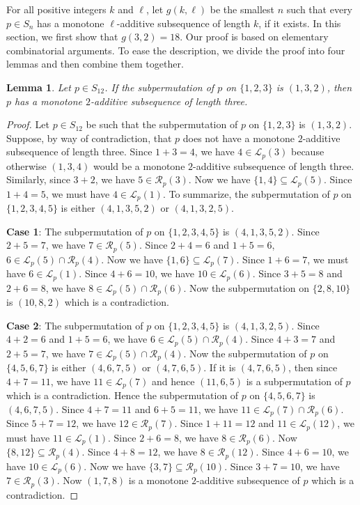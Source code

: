 \documentclass[10pt,a4paper]{amsart}
\newtheorem{lemma}[theorem]{Lemma}
\begin{document}
For all positive integers $k$ and $\ell$, let $g(k,\ell)$ be the smallest $n$ such that every $p\in S_n$ has a monotone $\ell$-additive subsequence of length $k$, if it exists. In this section, we first show that $g(3,2)=18$. Our proof is based on elementary combinatorial arguments. To ease the description, we divide the proof into four lemmas and then combine them together.

\begin{lemma}\label{Lemma:Monotone132}
Let $p\in S_{12}$. If the subpermutation of $p$ on $\{1,2,3\}$ is $(1,3,2)$, then $p$ has a monotone $2$-additive subsequence of length three.
\end{lemma}
\begin{proof}
    Let $p\in S_{12}$ be such that the subpermutation of $p$ on $\{1,2,3\}$ is $(1,3,2)$. Suppose, by way of contradiction, that $p$ does not have a monotone $2$-additive subsequence of length three. Since $1+3=4$, we have $4\in\mathcal{L}_p(3)$ because otherwise $(1,3,4)$ would be a monotone $2$-additive subsequence of length three. Similarly, since $3+2$, we have $5\in\mathcal{R}_p(3)$. Now we have $\{1,4\}\subseteq\mathcal{L}_p(5)$. Since $1+4=5$, we must have $4\in\mathcal{L}_p(1)$. To summarize, the subpermutation of $p$ on $\{1,2,3,4,5\}$ is either $(4,1,3,5,2)$ or $(4,1,3,2,5)$.

    {\bf Case 1}: The subpermutation of $p$ on $\{1,2,3,4,5\}$ is $(4,1,3,5,2)$. Since $2+5=7$, we have $7\in\mathcal{R}_p(5)$. Since $2+4=6$ and $1+5=6$, $6\in\mathcal{L}_p(5)\cap\mathcal{R}_p(4)$. Now we have $\{1,6\}\subseteq\mathcal{L}_p(7)$. Since $1+6=7$, we must have $6\in\mathcal{L}_p(1)$. Since $4+6=10$, we have $10\in\mathcal{L}_p(6)$. Since $3+5=8$ and $2+6=8$, we have $8\in\mathcal{L}_p(5)\cap\mathcal{R}_p(6)$. Now the subpermutation on $\{2,8,10\}$ is $(10,8,2)$ which is a contradiction.

    {\bf Case 2}: The subpermutation of $p$ on $\{1,2,3,4,5\}$ is $(4,1,3,2,5)$. Since $4+2=6$ and $1+5=6$, we have $6\in\mathcal{L}_p(5)\cap\mathcal{R}_p(4)$. Since $4+3=7$ and $2+5=7$, we have $7\in\mathcal{L}_p(5)\cap\mathcal{R}_p(4)$. Now the subpermutation of $p$ on $\{4,5,6,7\}$ is either $(4,6,7,5)$ or $(4,7,6,5)$. If it is $(4,7,6,5)$, then since $4+7=11$, we have $11\in\mathcal{L}_p(7)$ and hence $(11,6,5)$ is a subpermutation of $p$ which is a contradiction. Hence the subpermutation of $p$ on $\{4,5,6,7\}$ is $(4,6,7,5)$. Since $4+7=11$ and $6+5=11$, we have $11\in\mathcal{L}_p(7)\cap\mathcal{R}_p(6)$. Since $5+7=12$, we have $12\in\mathcal{R}_p(7)$. Since $1+11=12$ and $11\in\mathcal{L}_p(12)$, we must have $11\in\mathcal{L}_p(1)$. Since $2+6=8$, we have $8\in\mathcal{R}_p(6)$. Now $\{8,12\}\subseteq\mathcal{R}_p(4)$. Since $4+8=12$, we have $8\in\mathcal{R}_p(12)$. Since $4+6=10$, we have $10\in\mathcal{L}_p(6)$. Now we have $\{3,7\}\subseteq\mathcal{R}_p(10)$. Since $3+7=10$, we have $7\in\mathcal{R}_p(3)$. Now $(1,7,8)$ is a monotone $2$-additive subsequence of $p$ which is a contradiction.
\end{proof}
\end{document}
